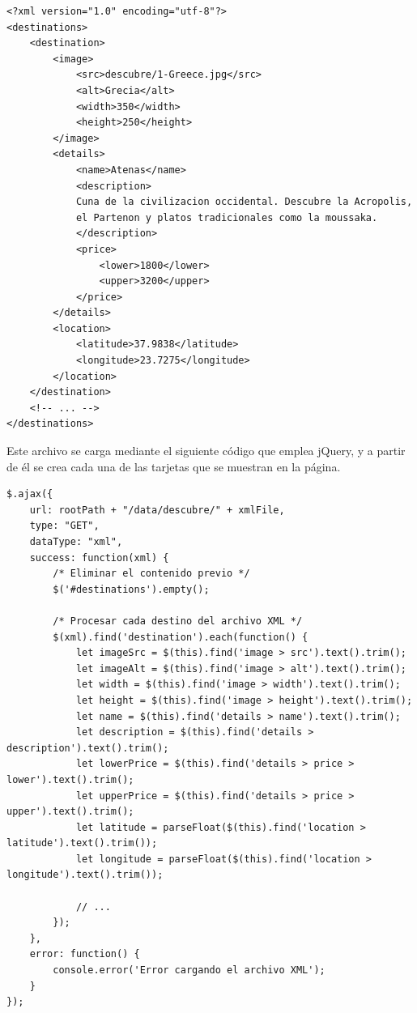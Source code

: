 \documentclass[11pt, a4paper]{book}
\begin{document}
	\begin{lstlisting}
<?xml version="1.0" encoding="utf-8"?>
<destinations>
    <destination>
        <image>
            <src>descubre/1-Greece.jpg</src>
            <alt>Grecia</alt>
            <width>350</width>
            <height>250</height>
        </image>
        <details>
            <name>Atenas</name>
            <description>
            Cuna de la civilizacion occidental. Descubre la Acropolis,
            el Partenon y platos tradicionales como la moussaka.
            </description>
            <price>
                <lower>1800</lower>
                <upper>3200</upper>
            </price>
        </details>
        <location>
            <latitude>37.9838</latitude>
            <longitude>23.7275</longitude>
        </location>
    </destination>
    <!-- ... -->
</destinations>
	\end{lstlisting}

    Este archivo se carga mediante el siguiente código que emplea jQuery, y a partir de él se crea cada una de las tarjetas que se muestran en la página.

	\begin{lstlisting}
$.ajax({
    url: rootPath + "/data/descubre/" + xmlFile,
    type: "GET",
    dataType: "xml",
    success: function(xml) {
        /* Eliminar el contenido previo */
        $('#destinations').empty();

        /* Procesar cada destino del archivo XML */
        $(xml).find('destination').each(function() {
            let imageSrc = $(this).find('image > src').text().trim();
            let imageAlt = $(this).find('image > alt').text().trim();
            let width = $(this).find('image > width').text().trim();
            let height = $(this).find('image > height').text().trim();
            let name = $(this).find('details > name').text().trim();
            let description = $(this).find('details > description').text().trim();
            let lowerPrice = $(this).find('details > price > lower').text().trim();
            let upperPrice = $(this).find('details > price > upper').text().trim();
            let latitude = parseFloat($(this).find('location > latitude').text().trim());
            let longitude = parseFloat($(this).find('location > longitude').text().trim());

            // ...
        });
    },
    error: function() {
        console.error('Error cargando el archivo XML');
    }
});
	\end{lstlisting}
\end{document}
